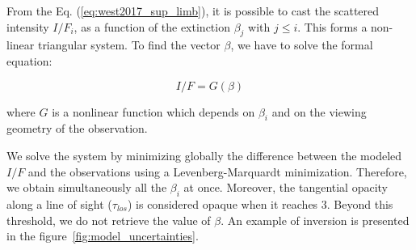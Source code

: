 From the Eq. (\ref{eq:west2017_sup_limb}), it is possible to cast the scattered intensity $I/F_i$, as a function of
the extinction $\beta_j$ with $j \le i$. This forms a non-linear triangular system. To find the vector $\beta$, we
have to solve the formal equation:

\begin{equation}
    I/F = G(\beta)
\end{equation}

where ${G}$ is a nonlinear function which depends on $\beta_i$ and on the viewing geometry of the observation.

We solve the system by minimizing globally the difference between the modeled $I/F$ and the observations
using a Levenberg-Marquardt minimization. Therefore, we obtain simultaneously all the $\beta_i$ at once.
Moreover, the tangential opacity along a line of sight ($\tau_{los}$) is considered opaque when it reaches 3.
Beyond this threshold, we do not retrieve the value of $\beta$.
An example of inversion is presented in the figure~\ref{fig:model_uncertainties}.

